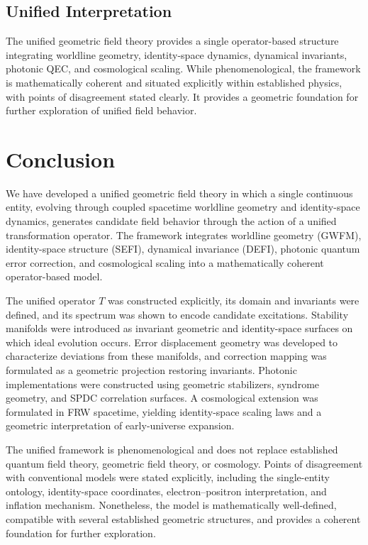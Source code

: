 \documentclass[aip,jmp,reprint,onecolumn,nofootinbib]{revtex4-2}
\begin{document}
\subsection{Unified Interpretation}

The unified geometric field theory provides a single operator-based structure integrating 
worldline geometry, identity-space dynamics, dynamical invariants, photonic QEC, and 
cosmological scaling. While phenomenological, the framework is mathematically coherent 
and situated explicitly within established physics, with points of disagreement stated 
clearly. It provides a geometric foundation for further exploration of unified field behavior.
\section{Conclusion}

We have developed a unified geometric field theory in which a single continuous entity, 
evolving through coupled spacetime worldline geometry and identity-space dynamics, 
generates candidate field behavior through the action of a unified transformation operator. 
The framework integrates worldline geometry (GWFM), identity-space structure (SEFI), 
dynamical invariance (DEFI), photonic quantum error correction, and cosmological scaling 
into a mathematically coherent operator-based model.

The unified operator $T$ was constructed explicitly, its domain and invariants were defined, 
and its spectrum was shown to encode candidate excitations. Stability manifolds were 
introduced as invariant geometric and identity-space surfaces on which ideal evolution 
occurs. Error displacement geometry was developed to characterize deviations from these 
manifolds, and correction mapping was formulated as a geometric projection restoring 
invariants. Photonic implementations were constructed using geometric stabilizers, syndrome 
geometry, and SPDC correlation surfaces. A cosmological extension was formulated in FRW 
spacetime, yielding identity-space scaling laws and a geometric interpretation of early-universe 
expansion.

The unified framework is phenomenological and does not replace established quantum field 
theory, geometric field theory, or cosmology. Points of disagreement with conventional 
models were stated explicitly, including the single-entity ontology, identity-space coordinates, 
electron–positron interpretation, and inflation mechanism. Nonetheless, the model is 
mathematically well-defined, compatible with several established geometric structures, and 
provides a coherent foundation for further exploration.
\end{document}
